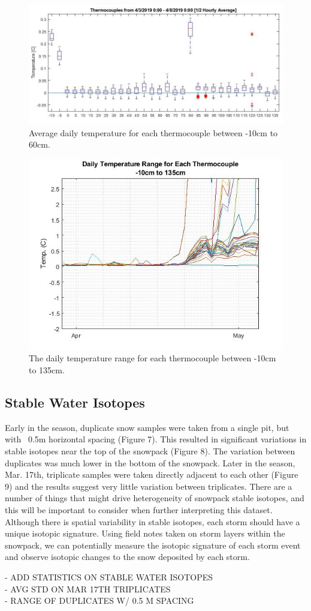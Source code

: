 \begin{figure}[H]
    \raggedleft
    \includegraphics[width=1\linewidth]{figures/Isotherm_boxplot.jpg}
    \caption{Average daily temperature for each thermocouple between -10cm to 60cm.}
    \label{fig:IsothermBoxplot}
 \end{figure}
 
 \begin{figure}[H]
    \centering
    \includegraphics[width=0.8\linewidth]{figures/DailyTempRange_Isotherm.jpg}
    \caption{The daily temperature range for each thermocouple between -10cm to 135cm.}
    \label{fig:DailyTempRange}
 \end{figure}

\subsection{Stable Water Isotopes}
Early in the season, duplicate snow samples were taken from a single pit, but with ~0.5m horizontal spacing (Figure 7). This resulted in significant variations in stable isotopes near the top of the snowpack (Figure 8). The variation between duplicates was much lower in the bottom of the snowpack. Later in the season, Mar. 17th, triplicate samples were taken directly adjacent to each other (Figure 9) and the results suggest very little variation between triplicates. There are a number of things that might drive heterogeneity of snowpack stable isotopes, and this will be important to consider when further interpreting this dataset. Although there is spatial variability in stable isotopes, each storm should have a unique isotopic signature. Using field notes taken on storm layers within the snowpack, we can potentially measure the isotopic signature of each storm event and observe isotopic changes to the snow deposited by each storm.

- ADD STATISTICS ON STABLE WATER ISOTOPES \\
    - AVG STD ON MAR 17TH TRIPLICATES\\
    - RANGE OF DUPLICATES W/ 0.5 M SPACING\\ 